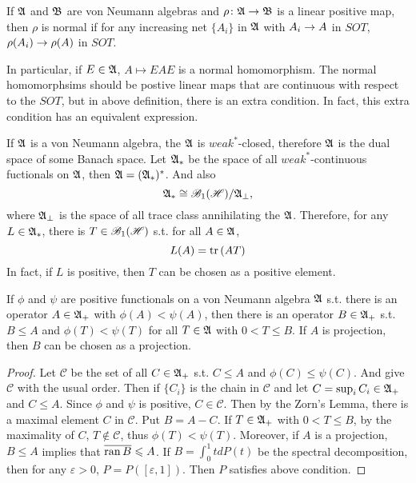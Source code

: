 \begin{defn}
	If $\mathfrak{A}$ and $\mathfrak{B}$ are von Neumann algebras and $\rho \colon \mathfrak{A} \rightarrow \mathfrak{B}$ is a linear positive map, then $\rho$ is normal if for any increasing net $\{A_i\}$ in $\mathfrak{A}$ with $A_i \rightarrow A$ in $SOT$, $\rho(A_i) \rightarrow \rho(A)$ in $SOT$.
\end{defn}
\begin{rem}
	In particular, if $E \in \mathfrak{A}$, $A \mapsto EAE$ is a normal homomorphism. The normal homomorphsims should be postive linear maps that are continuous with respect to the $SOT$, but in above definition, there is an extra condition. In fact, this extra condition has an equivalent expression.
\end{rem}

If $\mathfrak{A}$ is a von Neumann algebra, the $\mathfrak{A}$ is $weak^*$-closed, therefore $\mathfrak{A}$ is the dual space of some Banach space. Let $\mathfrak{A}_*$ be the space of all $weak^*$-continuous fuctionals on $\mathfrak{A}$, then $\mathfrak{A}  = (\mathfrak{A}_*)^*$. And also 
\begin{equation*}
	\mathfrak{A}_* \cong \mathscr{B}_{1}\mathscr{(H)} / \mathfrak{A}_{\bot},
\end{equation*}
where $\mathfrak{A}_{\bot}$ is the space of all trace class annihilating the $\mathfrak{A}$. Therefore, for any $L \in \mathfrak{A}_*$, there is $T \in \mathscr{B}_{1}\mathscr{(H)}$ s.t. for all $A \in \mathfrak{A}$, 
\begin{equation*}
	L(A) = \operatorname{tr}{(AT)}
\end{equation*}
In fact, if $L$ is positive, then $T$ can be chosen as a positive element.

\begin{lem}
	If $\phi$ and $\psi$ are positive functionals on a von Neumann algebra $\mathfrak{A}$ s.t. there is an operator $A \in \mathfrak{A}_+$ with $\phi(A)  < \psi(A)$, then there is an operator $B \in \mathfrak{A}_+$ s.t. $B \leqslant A$ and $\phi(T) < \psi(T)$ for all $T \in \mathfrak{A}$ with $0 <  T \leqslant  B$. If $A$ is projection, then $B$ can be chosen as a projection.
\end{lem}
\begin{proof}
	Let $\mathcal{C}$ be the set of all $C \in \mathfrak{A}_+$ s.t. $C \leqslant A$ and $\phi(C) \leqslant \psi(C)$. And give $\mathcal{C}$ with the usual order. Then if $\{C_i\}$ is the chain in $\mathcal{C}$ and let $C = \sup_i C_i \in \mathfrak{A}_+$  and $C \leqslant A$. Since $\phi$ and $\psi$ is positive, $C \in \mathcal{C}$. Then by the Zorn's Lemma, there is a maximal element $C$ in $\mathcal{C}$. Put $B = A-C$. If $T \in \mathfrak{A}_+$ with $0 < T \leqslant B$, by the maximality of $C$, $T \notin \mathcal{C}$, thus $\phi(T) < \psi(T)$. Moreover, if $A$ is a projection, $B \leqslant A$ implies that $\overline{\operatorname{ran}{B}} \leqslant A$. If $B = \int_0^1 t dP(t)$ be the spectral decomposition, then for any $\varepsilon >  0$, $P = P([\varepsilon,1])$. Then $P$ satisfies above condition.
\end{proof}


